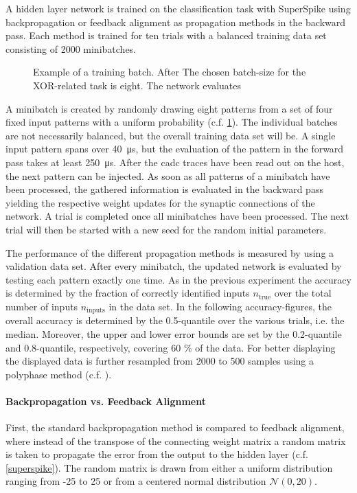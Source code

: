 A hidden layer network is trained on the classification task with SuperSpike using backpropagation or feedback alignment as propagation methods in the backward pass. Each method is trained for ten trials with a balanced training data set consisting of 2000 minibatches.

\begin{figure}
	\centering
	
	\caption[Example of a training batch.]{Example of a training batch. After The chosen batch-size for the XOR-related task is eight. The network evaluates}
	\label{batchpatterns}
\end{figure}

A minibatch is created by randomly drawing eight patterns from a set of four fixed input patterns with a uniform probability (c.f. \cref{batchpatterns}). The individual batches are not necessarily balanced, but the overall training data set will be. A single input pattern spans over \SI{40}{\micro \s}, but the evaluation of the pattern in the forward pass takes at least \SI{250}{\micro \s}. After the \gls{cadc} traces have been read out on the host, the next pattern can be injected. As soon as all patterns of a minibatch have been processed, the gathered information is evaluated in the backward pass yielding the respective weight updates for the synaptic connections of the network. A trial is completed once all minibatches have been processed. The next trial will then be started with a new seed for the random initial parameters.

The performance of the different propagation methods is measured by using a validation data set. After every minibatch, the updated network is evaluated by testing each pattern exactly one time. As in the previous experiment the accuracy is determined by the fraction of correctly identified inputs $n_\text{true}$ over the total number of inputs $n_\text{inputs}$ in the data set. In the following accuracy-figures, the overall accuracy is determined by the 0.5-quantile over the various trials, i.e. the median. Moreover, the upper and lower error bounds are set by the 0.2-quantile and 0.8-quantile, respectively, covering 60 \% of the data. For better displaying the displayed data is further resampled from 2000 to 500 samples using a polyphase method  (c.f. \citealp{scipypolyresample}).

\paragraph{Backpropagation vs. Feedback Alignment}
First, the standard backpropagation method is compared to feedback alignment, where instead of the transpose of the connecting weight matrix a random matrix is taken to propagate the error from the output to the hidden layer (c.f. \cref{superspike}). The random matrix is drawn from either a uniform distribution ranging from -25 to 25 or from a centered normal distribution $\mathcal{N}(0, 20)$.

